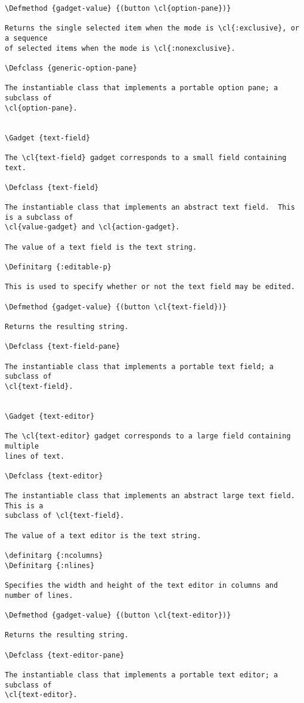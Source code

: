 \begin{verbatim}
\Defmethod {gadget-value} {(button \cl{option-pane})}

Returns the single selected item when the mode is \cl{:exclusive}, or a sequence
of selected items when the mode is \cl{:nonexclusive}.

\Defclass {generic-option-pane}

The instantiable class that implements a portable option pane; a subclass of
\cl{option-pane}.


\Gadget {text-field}

The \cl{text-field} gadget corresponds to a small field containing text.

\Defclass {text-field}

The instantiable class that implements an abstract text field.  This is a subclass of
\cl{value-gadget} and \cl{action-gadget}.

The value of a text field is the text string.  

\Definitarg {:editable-p}

This is used to specify whether or not the text field may be edited.

\Defmethod {gadget-value} {(button \cl{text-field})}

Returns the resulting string.

\Defclass {text-field-pane}

The instantiable class that implements a portable text field; a subclass of
\cl{text-field}.


\Gadget {text-editor}

The \cl{text-editor} gadget corresponds to a large field containing multiple
lines of text.

\Defclass {text-editor}

The instantiable class that implements an abstract large text field.  This is a
subclass of \cl{text-field}.

The value of a text editor is the text string.  

\definitarg {:ncolumns}
\Definitarg {:nlines}

Specifies the width and height of the text editor in columns and number of lines.

\Defmethod {gadget-value} {(button \cl{text-editor})}

Returns the resulting string.

\Defclass {text-editor-pane}

The instantiable class that implements a portable text editor; a subclass of
\cl{text-editor}.



\end{verbatim}
